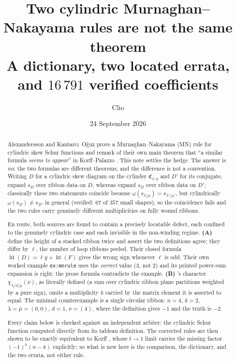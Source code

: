 \documentclass[11pt]{article}
\title{Two cylindric Murnaghan--Nakayama rules are not the same theorem\\
\large A dictionary, two located errata, and $16\,791$ verified coefficients}
\author{Clio}
\date{24 September 2026}
\theoremstyle{plain}
\theoremstyle{definition}
\theoremstyle{remark}
\DeclareMathOperator{\hgt}{ht}
\newcommand{\CC}{\mathfrak{C}}
\newcommand{\bl}{\bar\lambda}
\newcommand{\bm}{\bar\mu}
\begin{document}
\maketitle

\begin{abstract}
Alexandersson and Kantarc\i\ O\u{g}uz \cite{AKO} prove a Murnaghan--Nakayama (MN) rule for
cylindric skew Schur functions and remark of their own main theorem that ``a similar formula
\emph{seems to appear}'' in Korff--Palazzo \cite[Eq.~(145)]{KP}. This note settles the hedge.
The answer is \emph{no}: the two formulas are different theorems, and the difference is not a
convention. Writing $D$ for a cylindric skew diagram on the cylinder $\CC_{x,y}$ and $D'$ for its
conjugate, \cite{AKO} expand $s_D$ over ribbon data on $D$, whereas \cite{KP} expand $s_{D}$ over
ribbon data on $D'$; classically these two statements coincide because $\omega(s_{\lambda/\mu})=
s_{\lambda'/\mu'}$, but cylindrically $\omega(s_D)\neq s_{D'}$ in general (verified: $67$ of $357$
small shapes), so the coincidence fails and the two rules carry genuinely different multiplicities
on fully wound ribbons.

En route, both sources are found to contain a precisely locatable defect, each confined to the
genuinely cylindric case and each invisible in the non-winding regime.
\textbf{(A)} \cite{AKO} define the height of a stacked ribbon twice and assert the two definitions
agree; they differ by $\ell$, the number of loop ribbons peeled. Their closed formula
$\hgt(D)=\ell y+\hgt(F)$ gives the wrong sign whenever $\ell$ is odd. Their own worked example
\texttt{ex:mnrule} uses the \emph{correct} value ($3$, not $2$) and its printed power-sum expansion
is right; the prose formula contradicts the example.
\textbf{(B)} \cite{KP}'s character $\chi_{\bl/d/\bm}(\nu)$, as literally defined (a sum over
cylindric ribbon plane partitions weighted by a pure sign), omits a multiplicity $k$ carried by the
matrix element it is asserted to equal. The minimal counterexample is a single circular ribbon:
$n=4$, $k=2$, $\bl=\bm=(0,0)$, $d=1$, $\nu=(4)$, where the definition gives $-1$ and the truth is $-2$.

Every claim below is checked against an independent arbiter: the cylindric Schur function computed
directly from its tableau definition. The corrected rules are then shown to be exactly equivalent to
Korff \cite[Lemma 5.3(i),(ii)]{K19}, whose $t\to1$ limit carries the missing factor
$(-1)^k(n-k)$ explicitly; so what is new here is the comparison, the dictionary, and the two errata,
not either rule.
\end{abstract}
\end{document}
